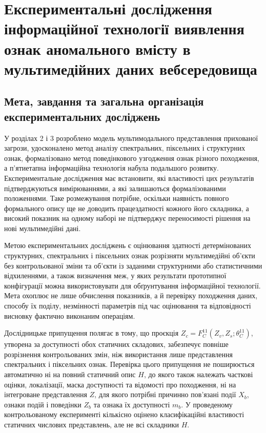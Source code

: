 \chapter{Експериментальні дослідження інформаційної технології виявлення ознак аномального вмісту в мультимедійних даних вебсередовища}
\label{chap:experiments}

\section{Мета, завдання та загальна організація експериментальних досліджень}

У розділах 2 і 3 розроблено модель мультимодального представлення прихованої загрози, удосконалено метод аналізу спектральних, піксельних і структурних ознак, формалізовано метод поведінкового узгодження ознак різного походження, а п’ятиетапна інформаційна технологія набула подальшого розвитку. Експериментальне дослідження має встановити, які властивості цих результатів підтверджуються вимірюваннями, а які залишаються формалізованими положеннями. Таке розмежування потрібне, оскільки наявність повного формального опису ще не доводить працездатності кожного його складника, а високий показник на одному наборі не підтверджує переносимості рішення на нові мультимедійні дані.

Метою експериментальних досліджень є оцінювання здатності детермінованих структурних, спектральних і піксельних ознак розрізняти мультимедійні об’єкти без контрольованої зміни та об’єкти із заданими структурними або статистичними відхиленнями, а також визначення меж, у яких результати прототипної конфігурації можна використовувати для обґрунтування інформаційної технології. Мета охоплює не лише обчислення показників, а й перевірку походження даних, способу їх поділу, незмінності параметрів під час оцінювання та відповідності висновку фактично виконаним операціям.

Дослідницьке припущення полягає в тому, що проєкція $Z_c=F_C^{11}(Z_v,\allowbreak Z_s;\allowbreak\theta_C^{11})$, утворена за доступності обох статичних складових, забезпечує повніше розрізнення контрольованих змін, ніж використання лише представлення спектральних і піксельних ознак. Перевірка цього припущення не поширюється автоматично ні на повний статичний опис $H$, до якого також належать часткові оцінки, локалізації, маска доступності та відомості про походження, ні на інтегроване представлення $Z$, для якого потрібні причинно пов’язані події $X_b$, ознаки подій і поведінки $Z_b$ та ознака їх доступності $m_b$. У проведеному контрольованому експерименті кількісно оцінено класифікаційні властивості статичних числових представлень, але не всі складники $H$.

